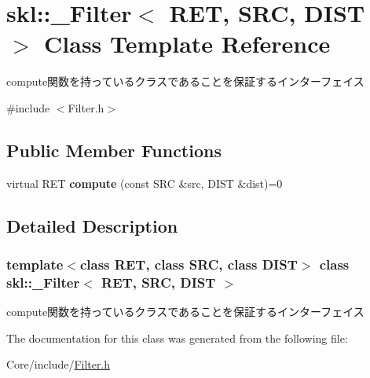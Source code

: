 \hypertarget{classskl_1_1___filter}{}\section{skl\+:\+:\+\_\+\+Filter$<$ R\+ET, S\+RC, D\+I\+ST $>$ Class Template Reference}
\label{classskl_1_1___filter}


compute関数を持っているクラスであることを保証するインターフェイス  




{\ttfamily \#include $<$Filter.\+h$>$}

\subsection*{Public Member Functions}
\begin{DoxyCompactItemize}
\item 
\hypertarget{classskl_1_1___filter_a9b3d6af9b65b08b4ca47278c3f579d19}{}\label{classskl_1_1___filter_a9b3d6af9b65b08b4ca47278c3f579d19} 
virtual R\+ET {\bfseries compute} (const S\+RC \&src, D\+I\+ST \&dist)=0
\end{DoxyCompactItemize}


\subsection{Detailed Description}
\subsubsection*{template$<$class R\+ET, class S\+RC, class D\+I\+ST$>$\newline
class skl\+::\+\_\+\+Filter$<$ R\+E\+T, S\+R\+C, D\+I\+S\+T $>$}

compute関数を持っているクラスであることを保証するインターフェイス 

The documentation for this class was generated from the following file\+:\begin{DoxyCompactItemize}
\item 
Core/include/\hyperlink{_filter_8h}{Filter.\+h}\end{DoxyCompactItemize}
